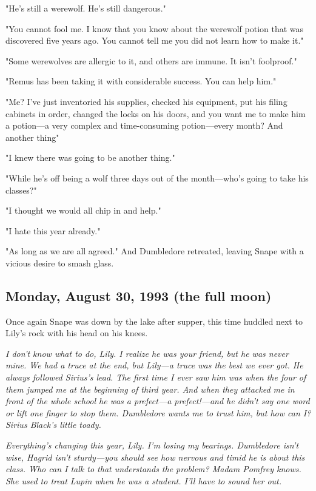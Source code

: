 "He's still a werewolf. He's still dangerous."

"You cannot fool me. I know that you know about the werewolf potion that was discovered five years ago. You cannot tell me you did not learn how to make it."

"Some werewolves are allergic to it, and others are immune. It isn't foolproof."

"Remus has been taking it with considerable success. You can help him."

"Me? I've just inventoried his supplies, checked his equipment, put his filing cabinets in order, changed the locks on his doors, and you want me to make him a potion—a very complex and time-consuming potion—every month? And another thing{\el}"

"I knew there was going to be another thing."

"While he's off being a wolf three days out of the month—who's going to take his classes?"

"I thought we would all chip in and help."

"I hate this year already."

"As long as we are all agreed." And Dumbledore retreated, leaving Snape with a vicious desire to smash glass.

\subsection{Monday, August 30, 1993 (the full moon)}

Once again Snape was down by the lake after supper, this time huddled next to Lily's rock with his head on his knees.

\emph{I don't know what to do, Lily. I realize he was your friend, but he was never mine. We had a truce at the end, but Lily—a truce was the best we ever got. He always followed Sirius's lead. The first time I ever saw him was when the four of them jumped me at the beginning of third year. And when they attacked me in front of the whole school he was a prefect—a prefect!—and he didn't say one word or lift one finger to stop them. Dumbledore wants me to trust him, but how can I? Sirius Black's little toady.}

\emph{Everything's changing this year, Lily. I'm losing my bearings. Dumbledore isn't wise, Hagrid isn't sturdy—you should see how nervous and timid he is about this class. Who can I talk to that understands the problem? Madam Pomfrey knows. She used to treat Lupin when he was a student. I'll have to sound her out.}


